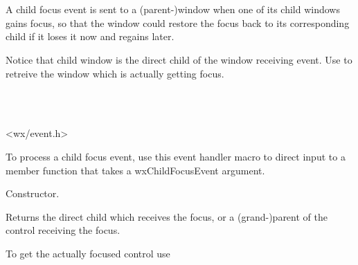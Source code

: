\section{}\label{wxchildfocusevent}

A child focus event is sent to a (parent-)window when one of its child windows gains focus,
so that the window could restore the focus back to its corresponding child
if it loses it now and regains later.

Notice that child window is the direct child of the window receiving event.
Use  to retreive the window which is actually getting focus. 


\\
\\


<wx/event.h>


To process a child focus event, use this event handler macro to direct input to a member
function that takes a wxChildFocusEvent argument.

\twocolwidtha{7cm}
\begin{twocollist}\itemsep=0pt
\end{twocollist}%





\label{wxchildfocuseventctor}


Constructor.




\label{wxchildfocuseventgetwindow}

Returns the direct child which receives the focus, or a (grand-)parent of the control receiving the focus.

To get the actually focused control use 

